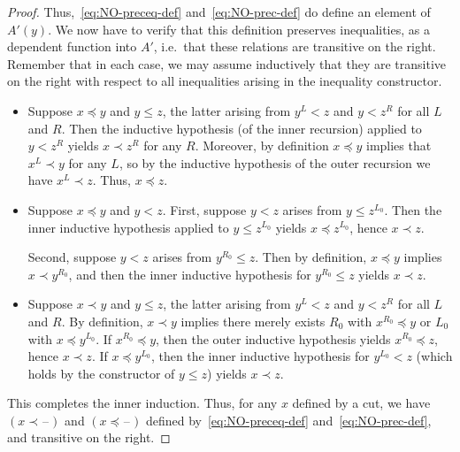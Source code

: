 \documentclass[10pt,a4paper]{article}
\newcommand{\blank}{\mathord{\hspace{1pt}\text{--}\hspace{1pt}}}
\theoremstyle{definition}
\theoremstyle{remark}
\numberwithin{equation}{section}
\begin{document}
\begin{proof}
  Thus,~\eqref{eq:NO-preceq-def} and~\eqref{eq:NO-prec-def} do define an element of $A'(y)$.
  We now have to verify that this definition preserves inequalities, as a dependent function into $A'$, i.e.\ that these relations are transitive on the right.
  Remember that in each case, we may assume inductively that they are transitive on the right with respect to all inequalities arising in the inequality constructor.
  \begin{itemize}
  \item Suppose $x\preceq y$ and $y\le z$, the latter arising from $y^L<z$ and $y<z^R$ for all $L$ and $R$.
    Then the inductive hypothesis (of the inner recursion) applied to $y<z^R$ yields $x\prec z^R$ for any $R$.
    Moreover, by definition $x\preceq y$ implies that $x^L \prec y$ for any $L$, so by the inductive hypothesis of the outer recursion we have $x^L \prec z$.
    Thus, $x\preceq z$.
  \item Suppose $x\preceq y$ and $y<z$.
    First, suppose $y<z$ arises from $y\le z^{L_0}$.
    Then the inner inductive hypothesis applied to $y\le z^{L_0}$ yields $x \preceq z^{L_0}$, hence $x\prec z$.

    Second, suppose $y<z$ arises from $y^{R_0}\le z$.
    Then by definition, $x\preceq y$ implies $x\prec y^{R_0}$, and then the inner inductive hypothesis for $y^{R_0}\le z$ yields $x\prec z$.
  \item Suppose $x\prec y$ and $y\le z$, the latter arising from $y^L<z$ and $y<z^R$ for all $L$ and $R$.
    By definition, $x\prec y$ implies there merely exists $R_0$ with $x^{R_0}\preceq y$ or $L_0$ with $x\preceq y^{L_0}$.
    If $x^{R_0}\preceq y$, then the outer inductive hypothesis yields $x^{R_0}\preceq z$, hence $x\prec z$.
    If $x\preceq y^{L_0}$, then the inner inductive hypothesis for $y^{L_0}<z$ (which holds by the constructor of $y\le z$) yields $x\prec z$.

  \end{itemize}
  This completes the inner induction.
  Thus, for any $x$ defined by a cut, we have $(x\prec \blank)$ and $(x\preceq \blank)$ defined by~\eqref{eq:NO-preceq-def} and~\eqref{eq:NO-prec-def}, and transitive on the right.


\end{proof}
\end{document}
